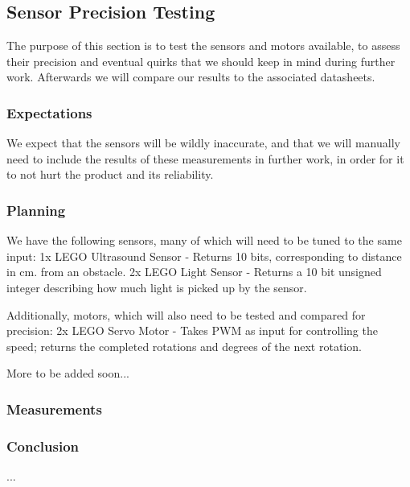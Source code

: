 \subsection{Sensor Precision Testing}
The purpose of this section is to test the sensors and motors available, to assess their precision and eventual quirks that we should keep in mind during further work. Afterwards we will compare our results to the associated datasheets.

\subsubsection{Expectations}
We expect that the sensors will be wildly inaccurate, and that we will manually need to include the results of these measurements in further work, in order for it to not hurt the product and its reliability.

\subsubsection{Planning}
We have the following sensors, many of which will need to be tuned to the same input:
1x LEGO Ultrasound Sensor
- Returns 10 bits, corresponding to distance in cm. from an obstacle.
2x LEGO Light Sensor
- Returns a 10 bit unsigned integer describing how much light is picked up by the sensor.

Additionally, motors, which will also need to be tested and compared for precision: 
2x LEGO Servo Motor
- Takes PWM\todo{} as input for controlling the speed; returns the completed rotations and degrees of the next rotation.

More to be added soon... \todo{}

\subsubsection{Measurements}






\subsubsection{Conclusion}
...